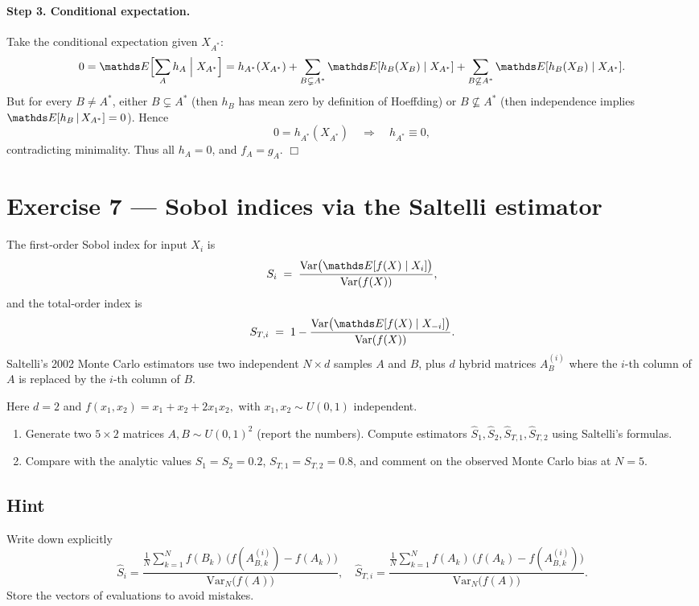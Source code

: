\documentclass[a4paper]{article}
\begin{document}
\paragraph{Step 3. Conditional expectation.}
Take the conditional expectation given $X_{A^*}$:
\[
0
= \E\Bigl[\sum_A h_A \Bigm| X_{A^*}\Bigr]
= h_{A^*}(X_{A^*})
  + \sum_{B\subsetneq A^*} \E[h_B(X_B)\mid X_{A^*}]
  + \sum_{B\not\subseteq A^*} \E[h_B(X_B)\mid X_{A^*}].
\]
But for every $B\neq A^*$, either $B\subsetneq A^*$ (then $h_B$ has mean zero
by definition of Hoeffding) or $B\not\subseteq A^*$ (then independence
implies $\E[h_B\,|\,X_{A^*}]=0$).  Hence
\[
0 = h_{A^*}(X_{A^*})
\quad\Longrightarrow\quad
h_{A^*}\equiv0,
\]
contradicting minimality.  Thus all $h_A=0$, and $f_A=g_A$.
\hfill\(\Box\)

\section*{Exercise 7 — Sobol indices via the Saltelli estimator}
\label{ex:Sobol_numeric_improved}

The first‐order Sobol index for input $X_i$ is
\[
S_i \;=\; \frac{\text{Var}\bigl(\E[f(X)\mid X_i]\bigr)}{\text{Var}(f(X))},
\]
and the total‐order index is
\[
S_{T,i} \;=\; 1 - \frac{\text{Var}\bigl(\E[f(X) \mid X_{-i}]\bigr)}{\text{Var}(f(X))}.
\]
Saltelli’s 2002 Monte Carlo estimators use two independent $N\times d$
samples $A$ and $B$, plus $d$ hybrid matrices $A^{(i)}_B$ where the
$i$-th column of $A$ is replaced by the $i$-th column of $B$.

Here $d=2$ and
\(
f(x_1,x_2)=x_1+x_2+2x_1x_2,
\)
with $x_1,x_2\sim U(0,1)$ independent.

\begin{enumerate}%
  \item Generate two $5\times2$ matrices $A,B\sim U(0,1)^2$ (report the numbers).
        Compute estimators
        \(\hat S_1,\hat S_2,\hat S_{T,1},\hat S_{T,2}\)
        using Saltelli’s formulas.
  \item Compare with the analytic values
        \(S_1=S_2=0.2\), \(S_{T,1}=S_{T,2}=0.8\),
        and comment on the observed Monte Carlo bias at $N=5$.
\end{enumerate}

\subsection*{Hint}
Write down explicitly
\[
\hat S_i
= \frac{\tfrac1N\sum_{k=1}^N f(B_k)\,\bigl(f(A^{(i)}_{B,k})-f(A_k)\bigr)}
       {\text{Var}_N\bigl(f(A)\bigr)},
\quad
\hat S_{T,i}
= \frac{\tfrac1N\sum_{k=1}^N f(A_k)\,\bigl(f(A_k)-f(A^{(i)}_{B,k})\bigr)}
       {\text{Var}_N\bigl(f(A)\bigr)}.
\]
Store the vectors of evaluations to avoid mistakes.
\end{document}
